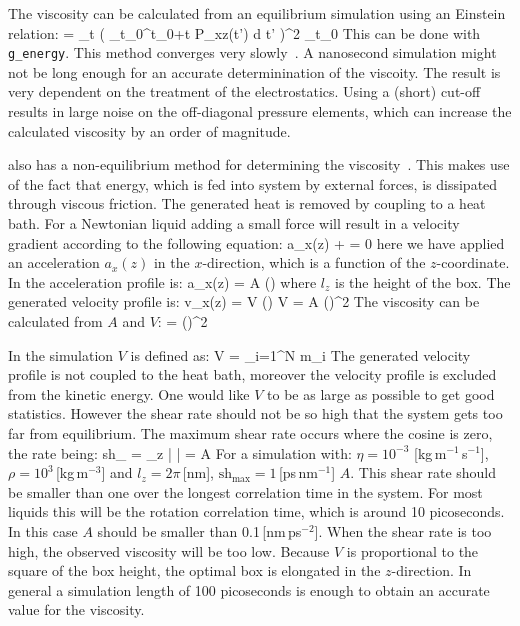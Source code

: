 The viscosity can be calculated from an equilibrium simulation using
an Einstein relation:
\beq
\eta =  \lim_{t \rightarrow \infty}
 \left\langle 
\left( \int_{t_0}^{{t_0}+t} P_{xz}(t') \mbox{d} t' \right)^2
\right\rangle_{t_0}
\eeq
This can be done with {\tt g\_energy}.
This method converges very slowly~\cite{Hess2002a}.
A nanosecond simulation might not
be long enough for an accurate determinination of the viscoity.
The result is very dependent on the treatment of the electrostatics.
Using a (short) cut-off results in large noise on the off-diagonal
pressure elements, which can increase the calculated viscosity by an order
of magnitude.

{\gromacs} also has a non-equilibrium method for determining
the viscosity~\cite{Hess2002a}.
This makes use of the fact that energy, which is fed into system by
external forces, is dissipated through viscous friction. The generated heat
is removed by coupling to a heat bath. For a Newtonian liquid adding a 
small force will result in a velocity gradient according to the following
equation:
\beq
a_x(z) + \frac{\eta}{\rho}  = 0
\eeq
here we have applied an acceleration $a_x(z)$ in the $x$-direction, which
is a function of the $z$-coordinate.
In {\gromacs} the acceleration profile is:
\beq
a_x(z) = A \cos\left(\right)
\eeq
where $l_z$ is the height of the box. The generated velocity profile is:
\beq
v_x(z) = V \cos\left(\right)
\eeq
\beq
V = A \frac{\rho}{\eta}\left(\right)^2
\eeq
The viscosity can be calculated from $A$ and $V$:
\beq
\label{visc}
\eta = \rho \left(\right)^2
\eeq

In the simulation $V$ is defined as:
\beq
V = 
         {\displaystyle \sum_{i=1}^N m_i}
\eeq
The generated velocity profile is not coupled to the heat bath, moreover
the velocity profile is excluded from the kinetic energy.
One would like $V$ to be as large as possible to get good statistics.
However the shear rate should not be so high that the system gets too far
from equilibrium. The maximum shear rate occurs where the cosine is zero,
the rate being:
\beq
\mbox{sh}_{\max} =  \max_z \left|  \right|
= A \frac{\rho}{\eta} 
\eeq
For a simulation with: $\eta=10^{-3}$ [kg\,m$^{-1}$\,s$^{-1}$],
$\rho=10^3$\,[kg\,m$^{-3}$] and $l_z=2\pi$\,[nm],
$\mbox{sh}_{\max}=1$\,[ps\,nm$^{-1}$] $A$.
This shear rate should be smaller than one over the longest
correlation time in the system. For most liquids this will be the rotation
correlation time, which is around 10 picoseconds. In this case $A$ should
be smaller than 0.1\,[nm\,ps$^{-2}$].
When the shear rate is too high, the observed viscosity will be too low.
Because $V$ is proportional to the square of the box height,
the optimal box is elongated in the $z$-direction.
In general a simulation length of 100 picoseconds is enough to obtain an
accurate value for the viscosity.


